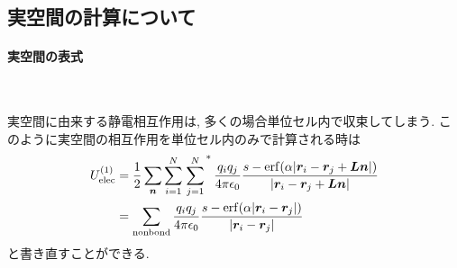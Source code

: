 \subsection{実空間の計算について}
\paragraph{実空間の表式} \

実空間に由来する静電相互作用は, 多くの場合単位セル内で収束してしまう.
このように実空間の相互作用を単位セル内のみで計算される時は
\begin{align}
    U_{\mathrm{elec}}^{(1)}
 &=
    \frac{1}{2} \sum_{\bm{n}} \sum_{i=1}^{N} \left.\sum_{j=1}^{N}\right.^{*}
    \frac{q_{i}q_{j}}{4 \pi \epsilon_{0}}
    \frac{s-\mathrm{erf}(\alpha |\bm{r}_{i} - \bm{r}_{j} + \bm{Ln}| )}
          {|\bm{r}_{i} - \bm{r}_{j} + \bm{Ln}|}
 \notag
 \\
 &=
    \sum_{\mathrm{nonbond}}
    \frac{q_{i}q_{j}}{4 \pi \epsilon_{0}}
    \frac{s-\mathrm{erf}(\alpha |\bm{r}_{i} - \bm{r}_{j}| )}
         {|\bm{r}_{i} - \bm{r}_{j}|}
 \notag
\end{align}
と書き直すことができる.

